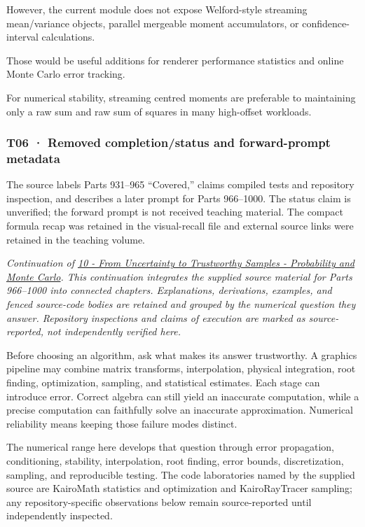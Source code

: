 However, the current module does not expose Welford-style streaming mean/variance objects, parallel mergeable moment accumulators, or confidence-interval calculations.

Those would be useful additions for renderer performance statistics and online Monte Carlo error tracking.

For numerical stability, streaming centred moments are preferable to maintaining only a raw sum and raw sum of squares in many high-offset workloads.

\subsubsection{T06 · Removed completion/status and forward-prompt metadata}\label{02-foundations-ii-ch039-t06-removed-completionstatus-and-forward-prompt-metadata}

The source labels Parts 931--965 ``Covered,'' claims compiled tests and repository inspection, and describes a later prompt for Parts 966--1000. The status claim is unverified; the forward prompt is not received teaching material. The compact formula recap was retained in the visual-recall file and external source links were retained in the teaching volume.

\emph{Continuation of \hyperref[02-foundations-ii-ch039-learning-route]{10 - From Uncertainty to Trustworthy Samples - Probability and Monte Carlo}. This continuation integrates the supplied source material for Parts 966--1000 into connected chapters. Explanations, derivations, examples, and fenced source-code bodies are retained and grouped by the numerical question they answer. Repository inspections and claims of execution are marked as source-reported, not independently verified here.}

Before choosing an algorithm, ask what makes its answer trustworthy. A graphics pipeline may combine matrix transforms, interpolation, physical integration, root finding, optimization, sampling, and statistical estimates. Each stage can introduce error. Correct algebra can still yield an inaccurate computation, while a precise computation can faithfully solve an inaccurate approximation. Numerical reliability means keeping those failure modes distinct.

The numerical range here develops that question through error propagation, conditioning, stability, interpolation, root finding, error bounds, discretization, sampling, and reproducible testing. The code laboratories named by the supplied source are KairoMath statistics and optimization and KairoRayTracer sampling; any repository-specific observations below remain source-reported until independently inspected.

